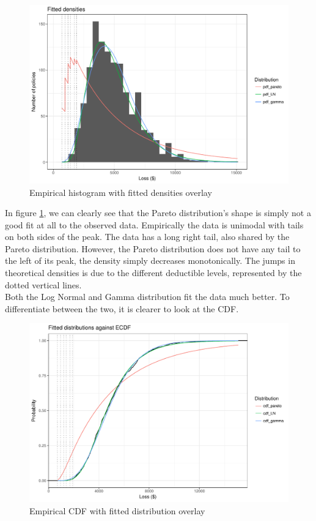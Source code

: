 \documentclass[titlepage]{article}
\begin{document}
	\begin{figure}[H]
		\centering
		\includegraphics[scale=0.7]{T1_PDF_comparison}
		\caption{Empirical histogram with fitted densities overlay} \label{fig:T1 PDF comparison}
	\end{figure}
	
	In figure \ref{fig:T1 PDF comparison}, we can clearly see that the Pareto distribution's shape is simply not a good fit at all to the observed data. Empirically the data is unimodal with tails on both sides of the peak. The data has a long right tail, also shared by the Pareto distribution. However, the Pareto distribution does not have any tail to the left of its peak, the density simply decreases monotonically. The jumps in theoretical densities is due to the different deductible levels, represented by the dotted vertical lines.\\
	Both the Log Normal and Gamma distribution fit the data much better. To differentiate between the two, it is clearer to look at the CDF.
	
	\begin{figure}[H]
		\centering
		\includegraphics[scale = 0.7]{T1_CDF_comparison}
		\caption{Empirical CDF with fitted distribution overlay} \label{fig:T1 CDF comparison}
	\end{figure} 
	
\end{document}
